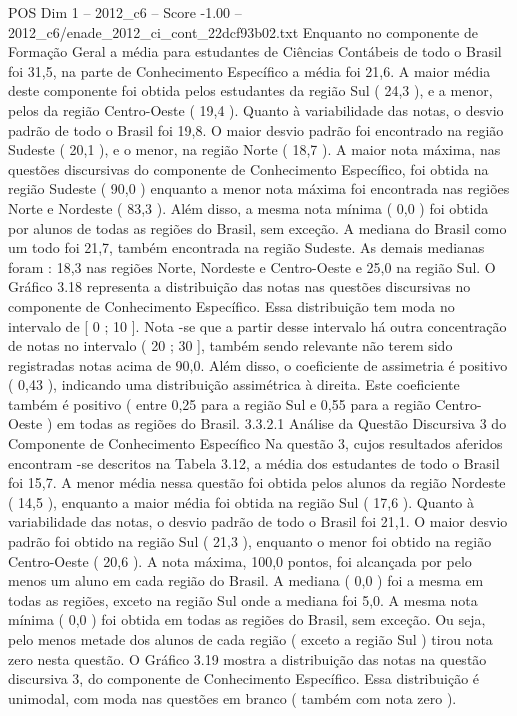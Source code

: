 \begin{textsample}{POS Dim 1 – 2012\_c6 – Score -1.00 – 2012\_c6/enade\_2012\_ci\_cont\_22dcf93b02.txt}
Enquanto no componente de Formação Geral a média para estudantes de Ciências Contábeis de todo o Brasil foi 31,5, na parte de Conhecimento Específico a média foi 21,6.
A maior média deste componente foi obtida pelos estudantes da região Sul ( 24,3 ), e a menor, pelos da região Centro-Oeste ( 19,4 ).
Quanto à variabilidade das notas, o desvio padrão de todo o Brasil foi 19,8.
O maior desvio padrão foi encontrado na região Sudeste ( 20,1 ), e o menor, na região Norte ( 18,7 ).
A maior nota máxima, nas questões discursivas do componente de Conhecimento Específico, foi obtida na região Sudeste ( 90,0 ) enquanto a menor nota máxima foi encontrada nas regiões Norte e Nordeste ( 83,3 ).
Além disso, a mesma nota mínima ( 0,0 ) foi obtida por alunos de todas as regiões do Brasil, sem exceção.
A mediana do Brasil como um todo foi 21,7, também encontrada na região Sudeste.
As demais medianas foram : 18,3 nas regiões Norte, Nordeste e Centro-Oeste e 25,0 na região Sul.
O Gráfico 3.18 representa a distribuição das notas nas questões discursivas no componente de Conhecimento Específico.
Essa distribuição tem moda no intervalo de [ 0 ; 10 ].
Nota -se que a partir desse intervalo há outra concentração de notas no intervalo ( 20 ; 30 ], também sendo relevante não terem sido registradas notas acima de 90,0.
Além disso, o coeficiente de assimetria é positivo ( 0,43 ), indicando uma distribuição assimétrica à direita.
Este coeficiente também é positivo ( entre 0,25 para a região Sul e 0,55 para a região Centro-Oeste ) em todas as regiões do Brasil. 3.3.2.1 Análise da Questão Discursiva 3 do Componente de Conhecimento Específico Na questão 3, cujos resultados aferidos encontram -se descritos na Tabela 3.12, a média dos estudantes de todo o Brasil foi 15,7.
A menor média nessa questão foi obtida pelos alunos da região Nordeste ( 14,5 ), enquanto a maior média foi obtida na região Sul ( 17,6 ).
Quanto à variabilidade das notas, o desvio padrão de todo o Brasil foi 21,1.
O maior desvio padrão foi obtido na região Sul ( 21,3 ), enquanto o menor foi obtido na região Centro-Oeste ( 20,6 ).
A nota máxima, 100,0 pontos, foi alcançada por pelo menos um aluno em cada região do Brasil.
A mediana ( 0,0 ) foi a mesma em todas as regiões, exceto na região Sul onde a mediana foi 5,0.
A mesma nota mínima ( 0,0 ) foi obtida em todas as regiões do Brasil, sem exceção.
Ou seja, pelo menos metade dos alunos de cada região ( exceto a região Sul ) tirou nota zero nesta questão.
O Gráfico 3.19 mostra a distribuição das notas na questão discursiva 3, do componente de Conhecimento Específico.
Essa distribuição é unimodal, com moda nas questões em branco ( também com nota zero ).

\end{textsample}
